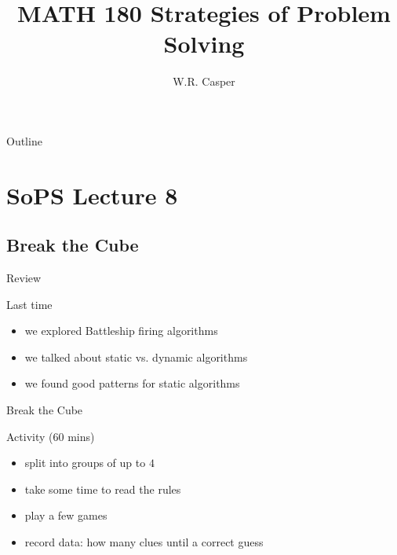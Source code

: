 \documentclass{beamer}
\title{MATH 180 Strategies of Problem Solving}
\subtitle
{} %
\author[W.R. Casper] %
{W.R. Casper}
\institute[California State University Fullerton] %
{
  Department of Mathematics\\
  California State University Fullerton}
\begin{document}
\begin{frame}
  \titlepage
\end{frame}

\begin{frame}{Outline}
  \tableofcontents
\end{frame}



\section{SoPS Lecture 8}
\subsection{Break the Cube}


\begin{frame}{Review}
  \begin{block}{Last time}
    \begin{itemize}
\pause
      \item we explored Battleship firing algorithms
\pause
      \item we talked about static vs. dynamic algorithms
\pause
      \item we found good patterns for static algorithms
    \end{itemize}
  \end{block}
\end{frame}

\begin{frame}{Break the Cube}
  \begin{block}{Activity (60 mins)}
    \begin{itemize}
\pause
      \item split into groups of up to $4$
\pause
      \item take some time to read the rules
\pause
      \item play a few games
\pause
      \item {\color{red}record data:} how many clues until a correct guess
    \end{itemize}
  \end{block}
\end{frame}
    
\end{document}
